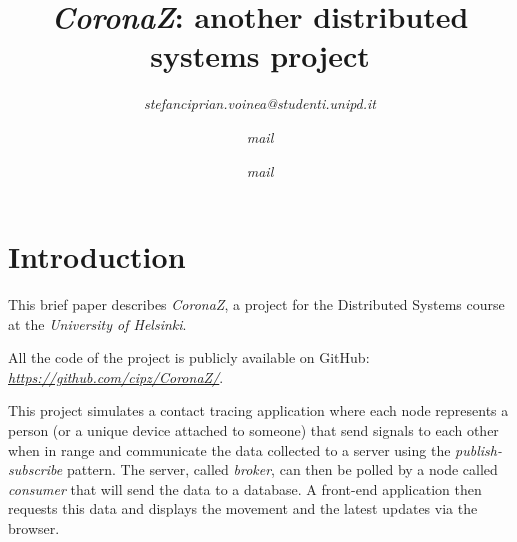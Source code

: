 \documentclass[conference]{IEEEtran}
\begin{document}
\title{\textit{CoronaZ}: another distributed systems project
}

\author{
	
	\textit{stefanciprian.voinea@studenti.unipd.it}
	\and
	\textit{mail}
	\and
	\textit{mail}
}

\maketitle



\section{Introduction}\label{sec:introduction}

	This brief paper describes \textit{CoronaZ}, a project for the Distributed Systems course at the \textit{University of Helsinki}.
	
	All the code of the project is publicly available on GitHub: \textit{\url{https://github.com/cipz/CoronaZ/}}.
	
	This project simulates a contact tracing application where each node represents a person (or a unique device attached to someone) that send signals to each other when in range and communicate the data collected to a server using the \textit{publish-subscribe} pattern.
	The server, called \textit{broker}, can then be polled by a node called \textit{consumer} that will send the data to a database.
	A front-end application then requests this data and displays the movement and the latest updates via the browser.
	
\end{document}
